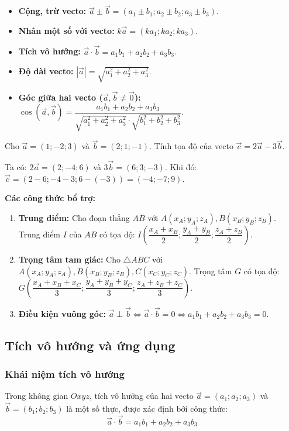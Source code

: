 \documentclass[12pt]{article}
\begin{document}
	\begin{itemize}
		\item \textbf{Cộng, trừ vecto:} $\vec{a} \pm \vec{b} = (a_1 \pm b_1; a_2 \pm b_2; a_3 \pm b_3)$.
		\item \textbf{Nhân một số với vecto:} $k\vec{a} = (ka_1; ka_2; ka_3)$.
		\item \textbf{Tích vô hướng:} $\vec{a} \cdot \vec{b} = a_1b_1 + a_2b_2 + a_3b_3$.
		\item \textbf{Độ dài vecto:} $|\vec{a}| = \sqrt{a_1^2 + a_2^2 + a_3^2}$.
		\item \textbf{Góc giữa hai vecto ($\vec{a}, \vec{b} \neq \vec{0}$):} $\cos(\vec{a}, \vec{b}) = \dfrac{a_1b_1 + a_2b_2 + a_3b_3}{\sqrt{a_1^2 + a_2^2 + a_3^2} \cdot \sqrt{b_1^2 + b_2^2 + b_3^2}}$.
	\end{itemize}
	
	\begin{vidu}[4]
		Cho $\vec{a} = (1; -2; 3)$ và $\vec{b} = (2; 1; -1)$. Tính tọa độ của vecto $\vec{c} = 2\vec{a} - 3\vec{b}$.
	\end{vidu}
	
	\begin{loigiai}
		Ta có: $2\vec{a} = (2; -4; 6)$ và $3\vec{b} = (6; 3; -3)$.
		Khi đó: $\vec{c} = (2-6; -4-3; 6-(-3)) = (-4; -7; 9)$.
	\end{loigiai}
	
	\noindent \textbf{Các công thức bổ trợ:}
	\begin{enumerate}[label=\alph*)]
		\item \textbf{Trung điểm:} Cho đoạn thẳng $AB$ với $A(x_A; y_A; z_A), B(x_B; y_B; z_B)$. Trung điểm $I$ của $AB$ có tọa độ:
		$I\left( \dfrac{x_A+x_B}{2}; \dfrac{y_A+y_B}{2}; \dfrac{z_A+z_B}{2} \right)$.
		\item \textbf{Trọng tâm tam giác:} Cho $\triangle ABC$ với $A(x_A; y_A; z_A), B(x_B; y_B; z_B), C(x_C; y_C; z_C)$. Trọng tâm $G$ có tọa độ:
		$G\left( \dfrac{x_A+x_B+x_C}{3}; \dfrac{y_A+y_B+y_C}{3}; \dfrac{z_A+z_B+z_C}{3} \right)$.
		\item \textbf{Điều kiện vuông góc:} $\vec{a} \perp \vec{b} \iff \vec{a} \cdot \vec{b} = 0 \iff a_1b_1 + a_2b_2 + a_3b_3 = 0$.
	\end{enumerate}
	
	\subsection{Tích vô hướng và ứng dụng}
	\subsubsection{Khái niệm tích vô hướng}
	Trong không gian $Oxyz$, tích vô hướng của hai vecto $\vec{a} = (a_1; a_2; a_3)$ và $\vec{b} = (b_1; b_2; b_3)$ là một số thực, được xác định bởi công thức:
	\[ \vec{a} \cdot \vec{b} = a_1b_1 + a_2b_2 + a_3b_3 \]
	
\end{document}
